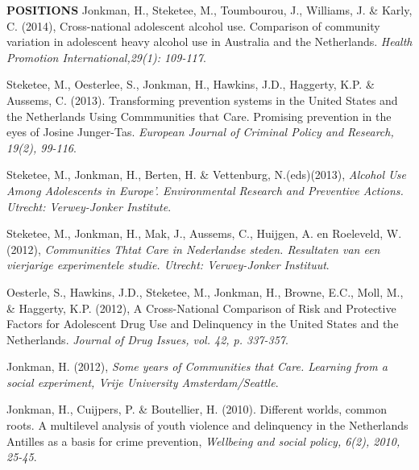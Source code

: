 \documentclass[
  16,
]{article}
\begin{document}
\begin{large}{\bf POSITIONS}
Jonkman, H., Steketee, M., Toumbourou, J., Williams, J. \& Karly, C.
(2014), Cross-national adolescent alcohol use. Comparison of community
variation in adolescent heavy alcohol use in Australia and the
Netherlands. \emph{Health Promotion International,29(1): 109-117}.

\vspace{3pt}

Steketee, M., Oesterlee, S., Jonkman, H., Hawkins, J.D., Haggerty, K.P.
\& Aussems, C. (2013). Transforming prevention systems in the United
States and the Netherlands Using Commmunities that Care. Promising
prevention in the eyes of Josine Junger-Tas.
\emph{European Journal of Criminal Policy and Research, 19(2), 99-116}.

\vspace{3pt}

Steketee, M., Jonkman, H., Berten, H. \& Vettenburg, N.(eds)(2013),
\emph{Alcohol Use Among Adolescents in Europe’. Environmental Research and Preventive Actions. Utrecht: Verwey-Jonker Institute}.

\vspace{3pt}

Steketee, M., Jonkman, H., Mak, J., Aussems, C., Huijgen, A. en
Roeleveld, W. (2012),
\emph{Communities Thtat Care in Nederlandse steden. Resultaten van een vierjarige experimentele studie. Utrecht: Verwey-Jonker Instituut}.

\vspace{3pt}

Oesterle, S., Hawkins, J.D., Steketee, M., Jonkman, H., Browne, E.C.,
Moll, M., \& Haggerty, K.P. (2012), A Cross-National Comparison of Risk
and Protective Factors for Adolescent Drug Use and Delinquency in the
United States and the Netherlands.
\emph{Journal of Drug Issues, vol. 42, p. 337-357}.

\vspace{3pt}

Jonkman, H. (2012),
\emph{Some years of Communities that Care. Learning from a social experiment, Vrije University Amsterdam/Seattle}.

\vspace{3pt}

Jonkman, H., Cuijpers, P. \& Boutellier, H. (2010). Different worlds,
common roots. A multilevel analysis of youth violence and delinquency in
the Netherlands Antilles as a basis for crime prevention,
\emph{Wellbeing and social policy, 6(2), 2010, 25-45}.

\vspace{3pt}


\end{large}
\end{document}
